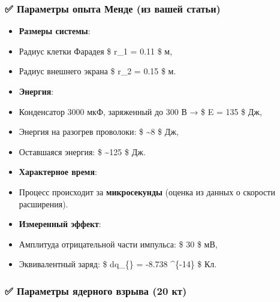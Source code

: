 \documentclass[11pt]{article}
\providecommand{\tightlist}{%
      \setlength{\itemsep}{0pt}\setlength{\parskip}{0pt}}
\begin{document}
\subsubsection{✅ Параметры опыта Менде (из вашей
статьи)}\label{ux43fux430ux440ux430ux43cux435ux442ux440ux44b-ux43eux43fux44bux442ux430-ux43cux435ux43dux434ux435-ux438ux437-ux432ux430ux448ux435ux439-ux441ux442ux430ux442ux44cux438}

\begin{itemize}
\tightlist
\item
  \textbf{Размеры системы}:\\
\item
  Радиус клетки Фарадея \$ r\_1 = 0.11 \$ м,\\
\item
  Радиус внешнего экрана \$ r\_2 = 0.15 \$ м.
\item
  \textbf{Энергия}:\\
\item
  Конденсатор 3000 мкФ, заряженный до 300 В → \$ E = 135 \$ Дж,\\
\item
  Энергия на разогрев проволоки: \$ \sim 8 \$ Дж,\\
\item
  Оставшаяся энергия: \$ \sim 125 \$ Дж.
\item
  \textbf{Характерное время}:\\
\item
  Процесс происходит за \textbf{микросекунды} (оценка из данных о
  скорости расширения).
\item
  \textbf{Измеренный эффект}:\\
\item
  Амплитуда отрицательной части импульса: \$ 30 \$ мВ,\\
\item
  Эквивалентный заряд: \$ dq\_\{\} = -8.738
  \^{}\{-14\} \$ Кл.
\end{itemize}

\subsubsection{✅ Параметры ядерного взрыва (20
кт)}\label{ux43fux430ux440ux430ux43cux435ux442ux440ux44b-ux44fux434ux435ux440ux43dux43eux433ux43e-ux432ux437ux440ux44bux432ux430-20-ux43aux442}
\end{document}
